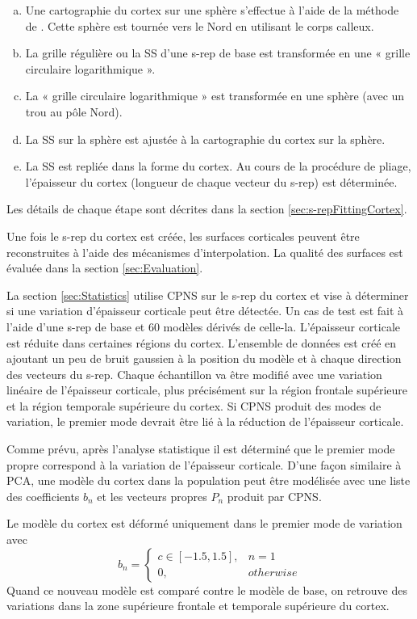 \begin{enumerate}[(a)]
\item Une cartographie du cortex sur une sphère s'effectue à l'aide de la méthode de \cite{fischl_cortical_1999}.
Cette sphère est tournée vers le Nord en utilisant le corps calleux.
\item La grille régulière ou la SS d'une s-rep de base est transformée en une « grille circulaire logarithmique ».
\item La « grille circulaire logarithmique » est transformée en une sphère (avec un trou au pôle Nord).
\item La SS sur la sphère est ajustée à la cartographie du cortex sur la sphère.
\item La SS est repliée dans la forme du cortex. Au cours de la procédure de pliage, l'épaisseur du cortex (longueur de chaque vecteur du s-rep) est déterminée.
\end{enumerate}
Les détails de chaque étape sont décrites dans la section \ref{sec:s-repFittingCortex}.

Une fois le s-rep du cortex est créée, les surfaces corticales peuvent être reconstruites à l'aide des mécanismes d'interpolation.
La qualité des surfaces est évaluée dans la section \ref{sec:Evaluation}.

La section \ref{sec:Statistics} utilise CPNS sur le s-rep du cortex et vise à déterminer si une variation d'épaisseur corticale peut être détectée.
Un cas de test est fait à l'aide d'une s-rep de base et 60 modèles dérivés de celle-la.
L'épaisseur corticale est réduite dans certaines régions du cortex.
L'ensemble de données est créé en ajoutant un peu de bruit gaussien 
à la position du modèle et à chaque direction des vecteurs du s-rep.
Chaque échantillon va être modifié avec une variation linéaire de l'épaisseur corticale, 
plus précisément sur la région frontale supérieure et la région temporale supérieure du cortex.
Si CPNS produit des modes de variation, le premier mode devrait être lié à la réduction de l'épaisseur corticale.

Comme prévu, après l'analyse statistique il est déterminé que le premier mode propre correspond à la variation de l'épaisseur corticale.
D'une façon similaire à PCA, une modèle du cortex dans la population peut être modélisée 
avec une liste des coefficients $b_n$ et les vecteurs propres $P_n$ produit par CPNS. 

Le modèle du cortex est déformé uniquement dans le premier mode de variation avec 
\begin{equation}
 b_n = \left\{
		  \begin{array}{lr}
			  c \in [-1.5, 1.5], & n = 1 \\
			  0, & otherwise
		  \end{array}
		  \right. 
\end{equation}
Quand ce nouveau modèle est comparé contre le modèle de base, on retrouve des variations dans la zone supérieure frontale et temporale supérieure du cortex. 

